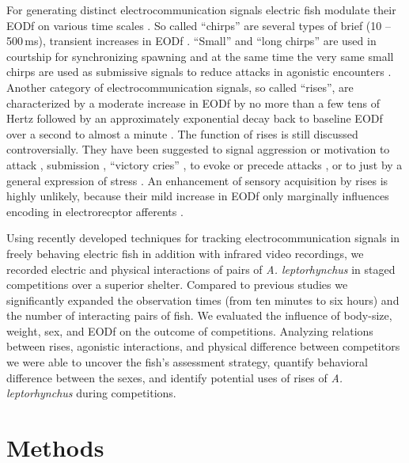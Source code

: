 \documentclass[vruler,JEB]{COB}%
\newcommand{\lepto}{\textit{A. leptorhynchus}}
\begin{document}
For generating distinct electrocommunication signals electric fish modulate their EODf on various time scales \citep{Benda2020}. So called ``chirps'' are several types of brief (10 -- 500\,ms), transient increases in EODf \citep{Engler2000, Zakon2002,Hupe2008b}. ``Small'' and ``long chirps'' are used in courtship for synchronizing spawning \citep{Henninger2018} and at the same time the very same small chirps are used as submissive signals to reduce attacks in agonistic encounters \citep{Hupe2008, Henninger2018}. Another category of electrocommunication signals, so called ``rises'', are characterized by a moderate increase in EODf by no more than a few tens of Hertz followed by an approximately exponential decay back to baseline EODf over a second to almost a minute \citep{Hopkins1974,Engler2000,Tallarovic2002,Zakon2002}. The function of rises is still discussed controversially. They have been suggested to signal aggression or motivation to attack \citep{Tallarovic2005, Triefenbach2008}, submission \citep{Hopkins1974, Serrano2003}, ``victory cries'' \citep{Dye1987}, to evoke or precede attacks \citep{Hopkins1974, Triefenbach2008}, or to just by a general expression of stress \citep{Smith2013}. An enhancement of sensory acquisition by rises is highly unlikely, because their mild increase in EODf only marginally influences encoding in electrorecptor afferents \citep{Walz2014}.

Using recently developed techniques for tracking electrocommunication signals in freely behaving electric fish \citep{Henninger2018,Madhav2018,Henninger2020} in addition with infrared video recordings, we recorded electric and physical interactions of pairs of \lepto{} in staged competitions over a superior shelter. Compared to previous studies we significantly expanded the observation times (from ten minutes to six hours) and the number of interacting pairs of fish. We evaluated the influence of body-size, weight, sex, and EODf on the outcome of competitions. Analyzing relations between rises, agonistic interactions, and physical difference between competitors we were able to uncover the fish's assessment strategy, quantify behavioral difference between the sexes, and identify potential uses of rises of \lepto{} during competitions. 


\section{Methods}    %
\end{document}
